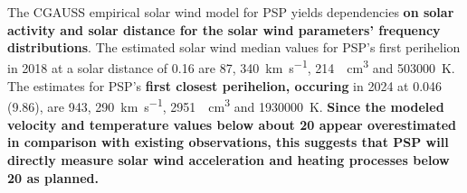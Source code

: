 {The CGAUSS empirical solar wind model for PSP yields dependencies \textbf{on solar activity and solar distance for the solar wind parameters' frequency distributions}. The estimated solar wind median values for PSP’s first perihelion in 2018 at a solar distance of \SI{0.16}{\au} are \SI{87}{\nT}, \SI{340}{\km\per\s}, \SI{214}{\per\cm\cubed} and \SI{503000}{\K}. The estimates for PSP’s \textbf{first closest perihelion, occuring} in 2024 at \SI{0.046}{\au} (\SI{9.86}{\Rs}), are \SI{943}{\nT}, \SI{290}{\km\per\s}, \SI{2951}{\per\cm\cubed} and \SI{1930000}{\K}. \textbf{Since the modeled velocity and temperature values below about \SI{20}{\Rs} appear overestimated in comparison with existing observations, this suggests that PSP will directly measure solar wind acceleration and heating processes below \SI{20}{\Rs} as planned. } }	%
{}	%

% 





